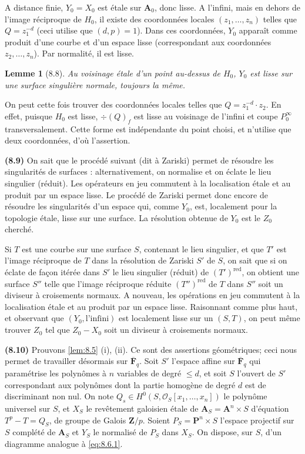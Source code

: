 \documentclass[12pt,a4paper]{amsart}
\theoremstyle{plain}
\newtheorem{lemme}[theoreme]{Lemme}
\theoremstyle{definition}
\theoremstyle{remark}
\newcommand{\Z}{\mathbf{Z}}
\newcommand{\F}{\mathbf{F}}
\numberwithin{equation}{section}
\begin{document}
A distance finie, $Y_0=X_0$ est \'etale sur $\mathbf{A}_0$, donc lisse. A l'infini, mais en dehors de l'image r\'eciproque de $H_0$, il existe des coordonn\'ees locales $(z_1,\ldots,z_n)$ telles que $Q=z_1^{-d}$ (ceci utilise que $(d,p)=1$). Dans ces coordonn\'ees, $Y_0$ appara\^it comme produit d'une courbe et d'un espace lisse (correspondant aux coordonn\'ees $z_2,\ldots,z_n$). Par normalit\'e, il est lisse.

\begin{lemme}[8.8]\label{lem:8.8}
Au voisinage \'etale d'un point au-dessus de $H_0$, $Y_0$ est lisse sur une surface singuli\`ere normale, toujours la m\^eme.
\end{lemme}

On peut cette fois trouver des coordonn\'ees locales telles que $Q=z_1^{-d}\cdot z_2$. En effet, puisque $H_0$ est lisse, $\div(Q)_f$ est lisse au voisinage de l'infini et coupe $P_0^\infty$ transversalement. Cette forme est ind\'ependante du point choisi, et n'utilise que deux coordonn\'ees, d'o\`u l'assertion.

\noindent \textbf{(8.9)} On sait que le proc\'ed\'e suivant (dit \`a Zariski) permet de r\'esoudre les singularit\'es de surfaces : alternativement, on normalise et on \'eclate le lieu singulier (r\'eduit). Les op\'erateurs en jeu commutent \`a la localisation \'etale et au produit par un espace lisse. Le proc\'ed\'e de Zariski permet donc encore de r\'esoudre les singularit\'es d'un espace qui, comme $Y_0$, est, localement pour la topologie \'etale, lisse sur une surface. La r\'esolution obtenue de $Y_0$ est le $Z_0$ cherch\'e.

Si $T$ est une courbe sur une surface $S$, contenant le lieu singulier, et que $T'$ est l'image r\'eciproque de $T$ dans la r\'esolution de Zariski $S'$ de $S$, on sait que si on \'eclate de fa\c{c}on it\'er\'ee dans $S'$ le lieu singulier (r\'eduit) de $(T')^{\text{red}}$, on obtient une surface $S''$ telle que l'image r\'eciproque r\'eduite $(T'')^{\text{red}}$ de $T$ dans $S''$ soit un diviseur \`a croisements normaux. A nouveau, les op\'erations en jeu commutent \`a la localisation \'etale et au produit par un espace lisse. Raisonnant comme plus haut, et observant que $(Y_0, \text{l'infini})$ est localement lisse sur un $(S,T)$, on peut m\^eme trouver $Z_0$ tel que $Z_0-X_0$ soit un diviseur \`a croisements normaux.

\noindent \textbf{(8.10)} Prouvons \eqref{lem:8.5} (i), (ii). Ce sont des assertions g\'eom\'etriques; ceci nous permet de travailler d\'esormais sur $\overline{\F}_q$. Soit $S'$ l'espace affine sur $\overline{\F}_q$ qui param\'etrise les polyn\^omes \`a $n$ variables de degr\'e $\le d$, et soit $S$ l'ouvert de $S'$ correspondant aux polyn\^omes dont la partie homog\`ene de degr\'e $d$ est de discriminant non nul. On note $Q_s\in H^0(S,\mathcal{O}_S[x_1,\ldots,x_n])$ le polyn\^ome universel sur $S$, et $X_S$ le rev\^etement galoisien \'etale de $\mathbf{A}_S=\mathbf{A}^n\times S$ d'\'equation $T^p-T=Q_S$, de groupe de Galois $\Z/p$. Soient $P_S=\mathbf{P}^n\times S$ l'espace projectif sur $S$ compl\'et\'e de $\mathbf{A}_S$ et $Y_S$ le normalis\'e de $P_S$ dans $X_S$. On dispose, sur $S$, d'un diagramme analogue \`a \eqref{eq:8.6.1}.
\end{document}
